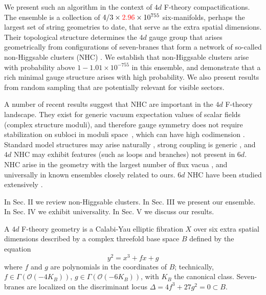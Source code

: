 \documentclass[aps,prl,twocolumn, superscriptaddress,groupedaddress,nofootinbib]{revtex4-1}
\begin{document}

We present such an algorithm in the context of $4d$ F-theory \cite{Vafa:1996xn,*Morrison:1996pp,*Morrison:1996pp}
compactifications. The ensemble is a collection of
$4/3\times{\color{red} 2.96}\times 10^{755}$ six-manifolds, perhaps the largest set
of string geometries to date, that serve as the extra spatial dimensions. Their topological structure determines the $4d$ gauge group that arises 
geometrically from
configurations of seven-branes that form a network of so-called non-Higgsable
clusters (NHC) \cite{Morrison:2012np}. We establish that non-Higgsable clusters arise with
probability above {\color{red}$1-1.01\times 10^{-755}$} in this ensemble, and demonstrate that a rich minimal gauge structure arises with high probability. We also
present results from random sampling that are potentially relevant for
visible sectors.

A number of recent results suggest that NHC are 
important in the $4d$ F-theory landscape. They exist for generic vacuum expectation values of
 scalar fields (complex structure moduli), and therefore
gauge symmetry does not require stabilization on subloci in 
moduli space~\cite{Grassi:2014zxa}, which can have high codimension \cite{Braun:2014xka,*Watari:2015ysa,*Halverson:2016tve}. Standard model structures may arise naturally \cite{Grassi:2014zxa}, strong coupling is generic \cite{Halverson:2016vwx}, and $4d$ NHC may exhibit features \cite{Morrison:2014lca} (such as loops and branches) not present
in $6d$. NHC arise in the geometry with the largest number of flux
vacua \cite{Taylor:2015xtz}, and universally in known ensembles 
\cite{Halverson:2015jua,*Taylor:2015ppa}  closely related to ours.
$6d$ NHC have been studied extensively \cite{Morrison:2012np,Morrison:2012js,*Taylor:2012dr,*Morrison:2014era,*Martini:2014iza,*Johnson:2014xpa,*Taylor:2015isa}.

In Sec. II we review non-Higgsable clusters. In Sec. III we present our ensemble.
In Sec. IV we exhibit universality. In Sec. V we discuss our results.


\vspace{.2cm}
A $4d$ F-theory geometry is a Calabi-Yau elliptic fibration
$X$ over six extra spatial dimensions  described by a complex threefold base space $B$ defined by the equation
\begin{equation}
y^2=x^3+f x + g
\end{equation}
where $f$ and $g$ are polynomials in the coordinates
of $B$;  technically, $f\in \Gamma(\mathcal{O}(-4K_B))$, $g\in \Gamma(\mathcal{O}(-6K_B))$, with $K_B$ the canonical class.
Seven-branes are localized on the discriminant locus
$\Delta=4f^3+27g^2=0\subset B$.
\end{document}
